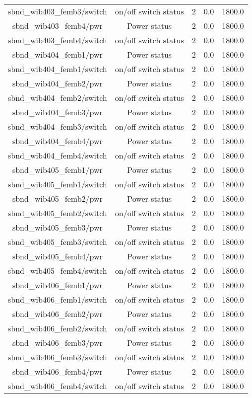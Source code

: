 \begin{center}
\begin{longtable}{c | c c c c }
sbnd\_wib403\_femb3/switch & on/off switch status & 2 & 0.0 & 1800.0\\ 
sbnd\_wib403\_femb4/pwr & Power status & 2 & 0.0 & 1800.0\\ 
sbnd\_wib403\_femb4/switch & on/off switch status & 2 & 0.0 & 1800.0\\ 
sbnd\_wib404\_femb1/pwr & Power status & 2 & 0.0 & 1800.0\\ 
sbnd\_wib404\_femb1/switch & on/off switch status & 2 & 0.0 & 1800.0\\ 
sbnd\_wib404\_femb2/pwr & Power status & 2 & 0.0 & 1800.0\\ 
sbnd\_wib404\_femb2/switch & on/off switch status & 2 & 0.0 & 1800.0\\ 
sbnd\_wib404\_femb3/pwr & Power status & 2 & 0.0 & 1800.0\\ 
sbnd\_wib404\_femb3/switch & on/off switch status & 2 & 0.0 & 1800.0\\ 
sbnd\_wib404\_femb4/pwr & Power status & 2 & 0.0 & 1800.0\\ 
sbnd\_wib404\_femb4/switch & on/off switch status & 2 & 0.0 & 1800.0\\ 
sbnd\_wib405\_femb1/pwr & Power status & 2 & 0.0 & 1800.0\\ 
sbnd\_wib405\_femb1/switch & on/off switch status & 2 & 0.0 & 1800.0\\ 
sbnd\_wib405\_femb2/pwr & Power status & 2 & 0.0 & 1800.0\\ 
sbnd\_wib405\_femb2/switch & on/off switch status & 2 & 0.0 & 1800.0\\ 
sbnd\_wib405\_femb3/pwr & Power status & 2 & 0.0 & 1800.0\\ 
sbnd\_wib405\_femb3/switch & on/off switch status & 2 & 0.0 & 1800.0\\ 
sbnd\_wib405\_femb4/pwr & Power status & 2 & 0.0 & 1800.0\\ 
sbnd\_wib405\_femb4/switch & on/off switch status & 2 & 0.0 & 1800.0\\ 
sbnd\_wib406\_femb1/pwr & Power status & 2 & 0.0 & 1800.0\\ 
sbnd\_wib406\_femb1/switch & on/off switch status & 2 & 0.0 & 1800.0\\ 
sbnd\_wib406\_femb2/pwr & Power status & 2 & 0.0 & 1800.0\\ 
sbnd\_wib406\_femb2/switch & on/off switch status & 2 & 0.0 & 1800.0\\ 
sbnd\_wib406\_femb3/pwr & Power status & 2 & 0.0 & 1800.0\\ 
sbnd\_wib406\_femb3/switch & on/off switch status & 2 & 0.0 & 1800.0\\ 
sbnd\_wib406\_femb4/pwr & Power status & 2 & 0.0 & 1800.0\\ 
sbnd\_wib406\_femb4/switch & on/off switch status & 2 & 0.0 & 1800.0\\ 

\hline
\end{longtable}
\end{center}



